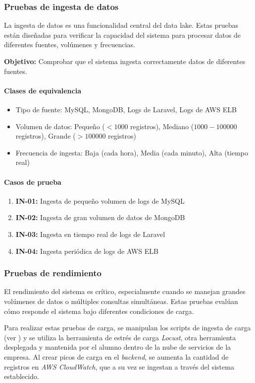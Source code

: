 \subsubsection{Pruebas de ingesta de datos}
La ingesta de datos es una funcionalidad central del data lake. Estas pruebas
están diseñadas para verificar la capacidad del sistema para procesar datos de
diferentes fuentes, volúmenes y frecuencias.

\textbf{Objetivo:} Comprobar que el sistema ingesta correctamente datos de
diferentes fuentes.

\paragraph{Clases de equivalencia}
\begin{itemize}
    \item Tipo de fuente: MySQL, MongoDB, Logs de Laravel, Logs de AWS ELB
    \item Volumen de datos: Pequeño ($<1000$ registros), Mediano ($1000-100000$
    	registros), Grande ($>100000$ registros)
    \item Frecuencia de ingesta: Baja (cada hora), Media (cada minuto), Alta
    	(tiempo real)
\end{itemize}

\paragraph{Casos de prueba}
\begin{enumerate}
    \item \textbf{IN-01:} Ingesta de pequeño volumen de logs de MySQL
    \item \textbf{IN-02:} Ingesta de gran volumen de datos de MongoDB
    \item \textbf{IN-03:} Ingesta en tiempo real de logs de Laravel
    \item \textbf{IN-04:} Ingesta periódica de logs de AWS ELB
\end{enumerate}


\newpage{}
\subsubsection{Pruebas de rendimiento}
El rendimiento del sistema es crítico, especialmente cuando se manejan grandes
volúmenes de datos o múltiples consultas simultáneas. Estas pruebas evalúan
cómo responde el sistema bajo diferentes condiciones de carga.

Para realizar estas pruebas de carga, se manipulan los scripts de ingesta de
carga (ver ) y se utiliza la herramienta de estrés de
carga \textit{Locust}, otra herramienta desplegada y mantenida por el alumno
dentro de la nube de servicios de la empresa. Al crear picos de carga en el
\textit{backend}, se aumenta la cantidad de registros en \textit{AWS CloudWatch},
que a su vez se ingestan a través del sistema establecido.

